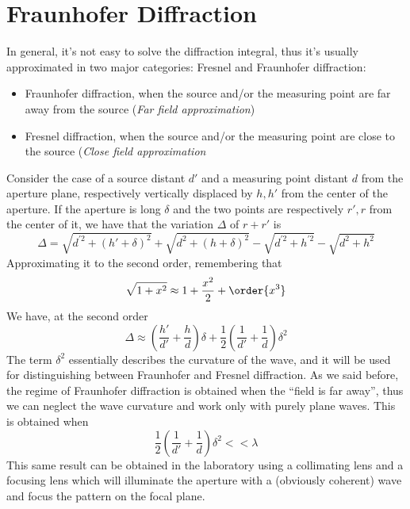 \documentclass[../electromagnetism.tex]{subfiles}
\begin{document}
\section{Fraunhofer Diffraction}
In general, it's not easy to solve the diffraction integral, thus it's usually approximated in two major categories: Fresnel and Fraunhofer diffraction:
\begin{itemize}
\item Fraunhofer diffraction, when the source and/or the measuring point are far away from the source (\textit{Far field approximation})
\item Fresnel diffraction, when the source and/or the measuring point are close to the source (\textit{Close field approximation}
\end{itemize}
Consider the case of a source distant $d'$ and a measuring point distant $d$ from the aperture plane, respectively vertically displaced by $h, h'$ from the center of the aperture. If the aperture is long $\delta$ and the two points are respectively $r', r$ from the center of it, we have that the variation $\Delta$ of $r+r'$ is 
\begin{equation}
	\Delta=\sqrt{d^{'2}+(h'+\delta)^2}+\sqrt{d^2+(h+\delta)^2}-\sqrt{d^{'2}+h^{'2}}-\sqrt{d^2+h^2}
	\label{eq:deltadef.diff}
\end{equation}
Approximating it to the second order, remembering that
\begin{equation*}
	\sqrt{1+x^2}\approx1+\frac{x^2}{2}+\order{x^3}
\end{equation*}
We have, at the second order
\begin{equation}
	\Delta\approx\left( \frac{h'}{d'}+\frac{h}{d} \right)\delta+\frac{1}{2}\left( \frac{1}{d'}+\frac{1}{d} \right)\delta^2
	\label{eq:deltaapprox.diff}
\end{equation}
The term $\delta^2$ essentially describes the curvature of the wave, and it will be used for distinguishing between Fraunhofer and Fresnel diffraction.
As we said before, the regime of Fraunhofer diffraction is obtained when the ``field is far away'', thus we can neglect the wave curvature and work only with purely plane waves. This is obtained when
\begin{equation*}
	\frac{1}{2}\left( \frac{1}{d'}+\frac{1}{d} \right)\delta^2<<\lambda
\end{equation*}
This same result can be obtained in the laboratory using a collimating lens and a focusing lens which will illuminate the aperture with a (obviously coherent) wave and focus the pattern on the focal plane.\\
\end{document}
